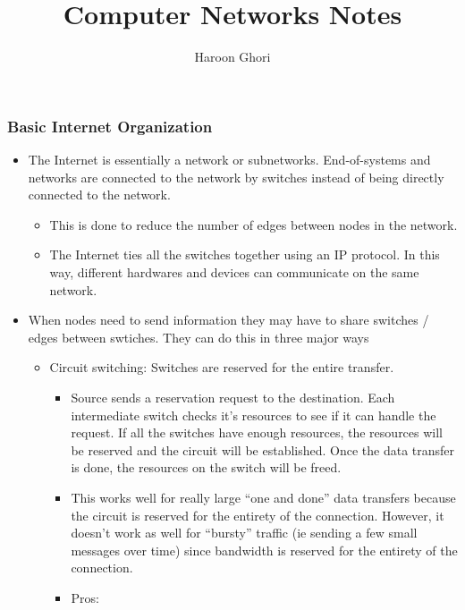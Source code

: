 \documentclass[]{article}
\title{Computer Networks Notes}
\author{Haroon Ghori}
\date{}
\providecommand{\tightlist}{%
  \setlength{\itemsep}{0pt}\setlength{\parskip}{0pt}}
\begin{document}
\maketitle

\hypertarget{basic-internet-organization}{%
\subsubsection{Basic Internet
Organization}\label{basic-internet-organization}}

\begin{itemize}
\tightlist
\item
  The Internet is essentially a network or subnetworks. End-of-systems
  and networks are connected to the network by switches instead of being
  directly connected to the network.

  \begin{itemize}
  \tightlist
  \item
    This is done to reduce the number of edges between nodes in the
    network.
  \item
    The Internet ties all the switches together using an IP protocol. In
    this way, different hardwares and devices can communicate on the
    same network.
  \end{itemize}
\item
  When nodes need to send information they may have to share switches /
  edges between swtiches. They can do this in three major ways

  \begin{itemize}
  \tightlist
  \item
    Circuit switching: Switches are reserved for the entire transfer.

    \begin{itemize}
    \tightlist
    \item
      Source sends a reservation request to the destination. Each
      intermediate switch checks it's resources to see if it can handle
      the request. If all the switches have enough resources, the
      resources will be reserved and the circuit will be established.
      Once the data transfer is done, the resources on the switch will
      be freed.
    \item
      This works well for really large ``one and done'' data transfers
      because the circuit is reserved for the entirety of the
      connection. However, it doesn't work as well for ``bursty''
      traffic (ie sending a few small messages over time) since
      bandwidth is reserved for the entirety of the connection.
    \item
      Pros:


\end{itemize}
\end{itemize}
\end{itemize}
\end{document}
